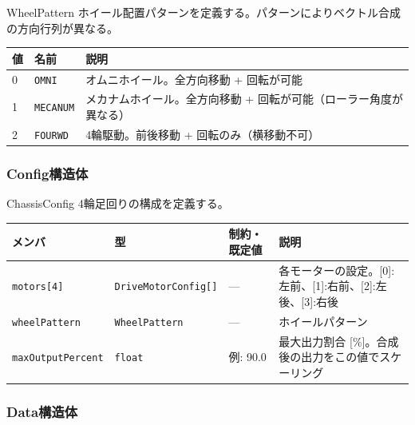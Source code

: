 \begin{funcblock}{WheelPattern}
ホイール配置パターンを定義する。パターンによりベクトル合成の方向行列が異なる。

\begin{longtable}{l l p{6.0cm}}
\toprule
\textbf{値} & \textbf{名前} & \textbf{説明} \\
\midrule
\endhead
0 & \texttt{OMNI}    & オムニホイール。全方向移動 + 回転が可能 \\
1 & \texttt{MECANUM} & メカナムホイール。全方向移動 + 回転が可能（ローラー角度が異なる） \\
2 & \texttt{FOURWD}  & 4輪駆動。前後移動 + 回転のみ（横移動不可） \\
\bottomrule
\end{longtable}
\end{funcblock}

\subsubsection{Config構造体}

\begin{funcblock}{ChassisConfig}
4輪足回りの構成を定義する。

\begin{longtable}{l l l p{4.0cm}}
\toprule
\textbf{メンバ} & \textbf{型} & \textbf{制約・既定値} & \textbf{説明} \\
\midrule
\endhead
\texttt{motors[4]}        & \texttt{DriveMotorConfig[]} & ---         & 各モーターの設定。[0]:左前、[1]:右前、[2]:左後、[3]:右後 \\
\texttt{wheelPattern}     & \texttt{WheelPattern}       & ---         & ホイールパターン \\
\texttt{maxOutputPercent}  & \texttt{float}             & 例: 90.0    & 最大出力割合 [\%]。合成後の出力をこの値でスケーリング \\
\bottomrule
\end{longtable}
\end{funcblock}

\subsubsection{Data構造体}

